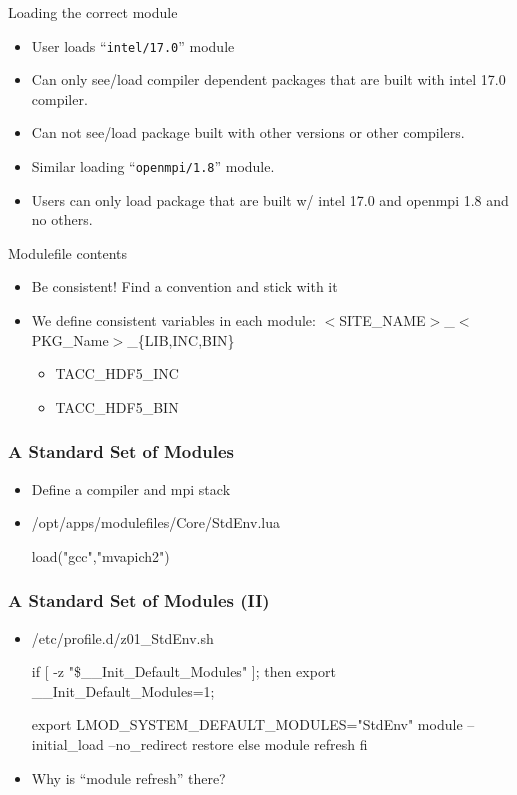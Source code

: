 \documentclass{beamer}
\begin{document}
\begin{frame}{Loading the correct module}
  \begin{itemize}
    \item User loads ``\texttt{intel/17.0}'' module
    \item Can only see/load compiler dependent packages that are built with
      intel 17.0 compiler.
    \item Can not see/load package built with other versions or other compilers.
    \item Similar loading ``\texttt{openmpi/1.8}'' module.
    \item Users can only load package that are built w/ intel 17.0 and
      openmpi 1.8 and no others.
  \end{itemize}
\end{frame}


\begin{frame}{Modulefile contents}
  \begin{itemize}
    \item Be consistent! Find a convention and stick with it
    \item We define consistent variables in each module:
      $<$SITE\_NAME$>$\_$<$PKG\_Name$>$\_\{LIB,INC,BIN\}
      \begin{itemize}
        \item TACC\_HDF5\_INC
        \item TACC\_HDF5\_BIN
      \end{itemize}
  \end{itemize}
\end{frame}


\begin{frame}[fragile]
    \frametitle{A Standard Set of Modules}
  \begin{itemize}
    \item Define a compiler and mpi stack
    \item /opt/apps/modulefiles/Core/StdEnv.lua
  {\small
    \begin{semiverbatim}
load("gcc","mvapich2")
    \end{semiverbatim}
}
  \end{itemize}
\end{frame}


\begin{frame}[fragile]
    \frametitle{A Standard Set of Modules (II)}
  \begin{itemize}
    \item /etc/profile.d/z01\_StdEnv.sh
  {\small
    \begin{semiverbatim}
   if [ -z "\$\_\_Init\_Default\_Modules" ]; then
      export \_\_Init\_Default\_Modules=1;

      export LMOD\_SYSTEM\_DEFAULT\_MODULES="StdEnv"
      module --initial\_load --no\_redirect restore
   else
      module refresh
   fi
    \end{semiverbatim}
}
    \item Why is  ``module refresh'' there?
  \end{itemize}
\end{frame}
\end{document}
